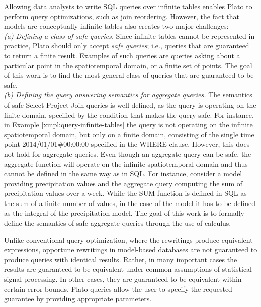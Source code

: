 Allowing data analysts to write SQL queries over infinite tables enables Plato to perform query optimizations, such as join reordering. However, the fact that models are conceptually infinite tables also creates two major challenges:\\

\emph{(a) Defining a class of safe queries.} Since infinite tables cannot be represented in practice, Plato should only accept {\em safe queries}; i.e., queries that are guaranteed to return a finite result. Examples of such queries are queries asking about a particular point in the spatiotemporal domain, or a finite set of points. The goal of this work is to find the most general class of queries that are guaranteed to be safe.\\

\emph{(b) Defining the query answering semantics for aggregate queries.} The semantics of safe Select-Project-Join queries is well-defined, as the query is operating on the finite domain, specified by the condition that makes the query safe. For instance, in Example \ref{xmpl:query-infinite-tables} the query is not operating on the infinite spatiotemporal domain, but only on a finite domain, consisting of the single time point 2014/01/01\#00:00:00 specified in the WHERE clause.  However, this does not hold for aggregate queries. Even though an aggregate query can be safe, the aggregate function will operate on the infinite spatiotemporal domain and thus cannot be defined in the same way as in SQL. For instance, consider a model providing precipitation values and the aggregate query computing the sum of precipitation values over a week. While the SUM function is defined in SQL as the sum of a finite number of values, in the case of the model it has to be defined as the integral of the precipitation model. The goal of this work is to formally define the semantics of safe aggregate queries through the use of calculus. 


Unlike conventional query optimization, where the rewritings produce equivalent expressions, opportune rewritings in model-based databases are not guaranteed to produce queries with identical results. Rather, in many important cases the results are guaranteed to be equivalent under common assumptions of statistical signal processing. In other cases, they are guaranteed to be equivalent within certain error bounds. Plato queries allow the user to specify the requested guarantee by providing appropriate parameters.



